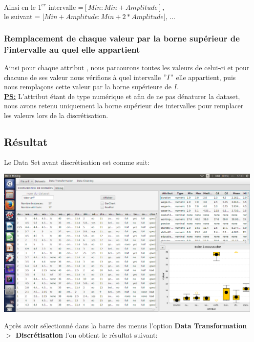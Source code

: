 \documentclass[12pt,a4paper,oneside]{book}
\begin{document}
\textbf{ }\\
Ainsi en le $1^{er}$ intervalle =$[Min : Min+Amplitude]$,\\
 le suivant = [$Min+Amplitude : Min+2*Amplitude$], ... 


\subsubsection{Remplacement de chaque valeur par la borne supérieur de l'intervalle au quel elle appartient}

Ainsi pour chaque attribut , nous parcourons toutes les valeurs de celui-ci et pour chacune de ses valeur nous vérifions à quel intervalle $"I"$ elle appartient, puis nous remplaçons cette valeur par la borne supérieure de $I$.\\

\underline{\textbf{PS:}} 
L'attribut étant de type numérique et afin de ne pas dénaturer la dataset, nous avons retenu uniquement la borne supérieur des intervalles pour remplacer les valeurs lors de la discrétisation.

\subsection{Résultat}
Le Data Set avant discrétisation est comme suit: 
\begin{center}
	\includegraphics[width=1\textwidth]{screens/avantDiscr.png}%
	\label{labelname}%
\end{center}

Après avoir sélectionné dans la barre des menus l'option \textbf{Data Transformation $>$ Discrétisation} l'on obtient le résultat suivant:
\end{document}
